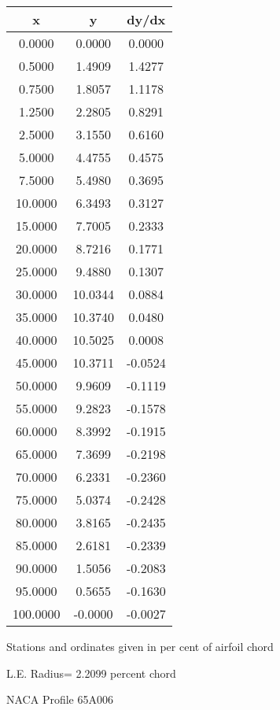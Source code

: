 \documentclass[11pt]{book}
\begin{document}
 \vspace{8mm}
 \begin{tabular}{|c|c|c|} \hline 
  x  &  y  &  dy/dx \\
 \hline
0.0000 & 0.0000 & 0.0000 \\
0.5000 & 1.4909 & 1.4277 \\
0.7500 & 1.8057 & 1.1178 \\
1.2500 & 2.2805 & 0.8291 \\
2.5000 & 3.1550 & 0.6160 \\
5.0000 & 4.4755 & 0.4575 \\
7.5000 & 5.4980 & 0.3695 \\
10.0000 & 6.3493 & 0.3127 \\
15.0000 & 7.7005 & 0.2333 \\
20.0000 & 8.7216 & 0.1771 \\
25.0000 & 9.4880 & 0.1307 \\
30.0000 & 10.0344 & 0.0884 \\
35.0000 & 10.3740 & 0.0480 \\
40.0000 & 10.5025 & 0.0008 \\
45.0000 & 10.3711 & -0.0524 \\
50.0000 & 9.9609 & -0.1119 \\
55.0000 & 9.2823 & -0.1578 \\
60.0000 & 8.3992 & -0.1915 \\
65.0000 & 7.3699 & -0.2198 \\
70.0000 & 6.2331 & -0.2360 \\
75.0000 & 5.0374 & -0.2428 \\
80.0000 & 3.8165 & -0.2435 \\
85.0000 & 2.6181 & -0.2339 \\
90.0000 & 1.5056 & -0.2083 \\
95.0000 & 0.5655 & -0.1630 \\
100.0000 & -0.0000 & -0.0027 \\
 \hline
 \end{tabular}
 \vspace{8mm}


Stations and ordinates given in per cent of airfoil chord 


L.E. Radius=  2.2099 percent chord
 \newpage
  \label{p65A006}
 \begin{Large}
 NACA Profile 65A006
 \end{Large}
  
\end{document}
